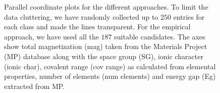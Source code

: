 \documentclass[superscriptaddress,unsortedaddress,
 amsmath,amssymb,
 aps,
]{revtex4-2}
\begin{document}
\begin{figure}[t] %
    \centering
    \begin{subfigure}{0.9\textwidth}
        \centering
        
    \end{subfigure}
    \begin{subfigure}{0.9\textwidth}
        \centering
          
    \end{subfigure}
    \begin{subfigure}{0.9\textwidth}
        \centering
          
    \end{subfigure}
    \caption{Parallel coordinate plots for the different approaches. To limit the data cluttering, we have randomly collected up to $250$ entries for each class and made the lines transparent. For the empirical approach, we have used all the $187$ suitable candidates. The axes show total magnetization (mag) taken from the Materials Project (MP) database along with the space group (SG), ionic character (ionic char), covalent range (cov range) as calculated from elemental properties, number of elements (num elements) and energy gap (Eg) extracted from MP.} 
    \label{fig:parallel-coordinates-approaches}
\end{figure}
\end{document}
